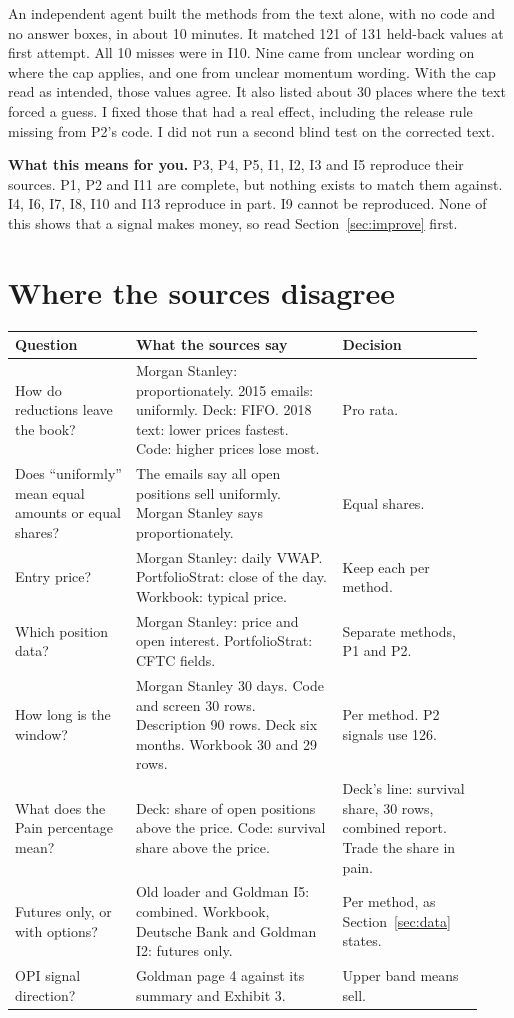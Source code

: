 \documentclass[11pt,a4paper]{article}
\newcommand{\sublabel}[1]{\par\vspace{3pt}\needspace{3\baselineskip}{\sffamily\small\bfseries #1}\par\nopagebreak[4]\vspace{1pt}}
\begin{document}
\sublabel{Blind test of this document}
An independent agent built the methods from the text alone, with no code and no answer boxes, in about 10 minutes. It matched 121 of 131 held-back values at first attempt. All 10 misses were in I10. Nine came from unclear wording on where the cap applies, and one from unclear momentum wording. With the cap read as intended, those values agree. It also listed about 30 places where the text forced a guess. I fixed those that had a real effect, including the release rule missing from P2's code. I did not run a second blind test on the corrected text.

\textbf{What this means for you.} P3, P4, P5, I1, I2, I3 and I5 reproduce their sources. P1, P2 and I11 are complete, but nothing exists to match them against. I4, I6, I7, I8, I10 and I13 reproduce in part. I9 cannot be reproduced. None of this shows that a signal makes money, so read Section~\ref{sec:improve} first.

\section{Where the sources disagree}\label{sec:conflicts}

\small
\begin{longtable}{@{}P{0.24\linewidth}P{0.41\linewidth}P{0.28\linewidth}@{}}
\toprule
Question & What the sources say & Decision \\
\midrule
\endhead
How do reductions leave the book? & Morgan Stanley: proportionately. 2015 emails: uniformly. Deck: FIFO. 2018 text: lower prices fastest. Code: higher prices lose most. & Pro rata. \\
Does ``uniformly'' mean equal amounts or equal shares? & The emails say all open positions sell uniformly. Morgan Stanley says proportionately. & Equal shares. \\
Entry price? & Morgan Stanley: daily VWAP. PortfolioStrat: close of the day. Workbook: typical price. & Keep each per method. \\
Which position data? & Morgan Stanley: price and open interest. PortfolioStrat: CFTC fields. & Separate methods, P1 and P2. \\
How long is the window? & Morgan Stanley 30 days. Code and screen 30 rows. Description 90 rows. Deck six months. Workbook 30 and 29 rows. & Per method. P2 signals use 126. \\
What does the Pain percentage mean? & Deck: share of open positions above the price. Code: survival share above the price. & Deck's line: survival share, 30 rows, combined report. Trade the share in pain. \\
Futures only, or with options? & Old loader and Goldman I5: combined. Workbook, Deutsche Bank and Goldman I2: futures only. & Per method, as Section~\ref{sec:data} states. \\
OPI signal direction? & Goldman page 4 against its summary and Exhibit 3. & Upper band means sell. \\
\bottomrule
\end{longtable}
\normalsize
\end{document}
